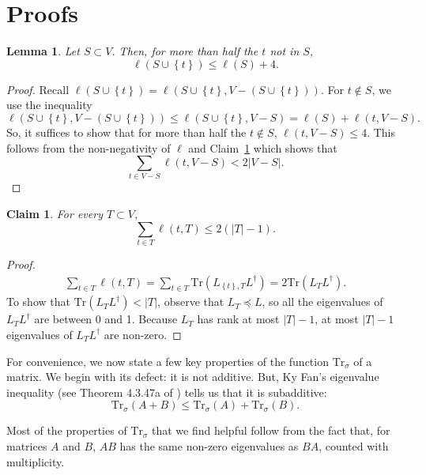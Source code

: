\documentclass[11pt]{article}
\def\trace#1{\mathrm{Tr} \left(#1 \right)}
\def\union{\cup}
\def\pleq{\preccurlyeq}
\def\setof#1{\left\{#1  \right\}}
\def\sizeof#1{\left|#1  \right|}
\def\trs#1{\mathrm{Tr}_{\sigma} \left(#1 \right)}
\def\Trs{\mathrm{Tr}_{\sigma}}
\newtheorem{lemma}[theorem]{Lemma}
\newtheorem{claim}[theorem]{Claim}
\begin{document}
\section{Proofs}



\begin{lemma}\label{lem:ell}
Let $S \subset V$. 
Then, for more than half the $t$ not in $S$,
\[
 \ell(S \union \setof{t}) \leq \ell(S) + 4.
\]
\end{lemma}
\begin{proof}
Recall $\ell(S \union \setof{t}) 
= \ell(S \union \setof{t}, V - (S \union \setof{t}))$.
For $t \not \in S$, we use the inequality 
\[
\ell(S \union \setof{t}, V - (S \union \setof{t}))
\leq 
\ell(S \union \setof{t}, V - S)
= \ell(S) + \ell(t, V - S).
\]
So, it suffices to show that for more than half the $t \not \in S$, 
$\ell(t, V - S) \leq 4$.  
This follows from the non-negativity of $\ell$ and Claim~\ref{clm:ell} which shows that 
\[
\sum_{t \in V - S} \ell(t, V - S) < 2 \sizeof{V - S} .
\]
\end{proof}


\begin{claim}\label{clm:ell}
For every $T \subset V$, 
\[ \sum_{t \in T} \ell(t, T) \leq 2 (\sizeof{T} - 1). \]
\end{claim}
\begin{proof}
\begin{align*}
\sum_{t \in T} \ell(t, T) 
= \sum_{t \in T} \trace{L_{\setof{t}, T} L^\dagger} 
= 2 \trace{L_{T} L^\dagger}.
\end{align*}
To show that $\trace{L_T L^\dagger} < \sizeof{T}$, observe that $L_T \pleq L$, so all the eigenvalues of $L_T L^\dagger$ are between 0 and 1.
Because $L_T$ has rank at most $\sizeof{T}-1$, at most $\sizeof{T}-1$ eigenvalues of $L_T L^\dagger$ are non-zero.

\end{proof}



For convenience, we now state a few key properties of the function $\Trs$ of a matrix.
We begin with its defect: it is not additive. 
But, Ky Fan's eigenvalue inequality (see Theorem 4.3.47a of \cite{HornJohnsonMatrix}) tells us that it is subadditive:
\begin{equation}\label{eqn:modtrace:subadditive}
\trs{A + B} \leq \trs{A} + \trs{B}.
\end{equation}

Most of the properties of $\Trs$ that we find helpful follow from the fact that, for matrices $A$ and $B$, $AB$ has the same non-zero eigenvalues as $BA$, counted with multiplicity.  
\end{document}
